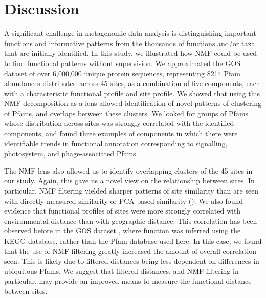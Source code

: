 
\section{Discussion}

A significant challenge in metagenomic data analysis is distinguishing important functions and informative patterns from the thousands of functions and/or taxa that are initially identified. In this study, we illustrated how NMF could be used to find functional patterns without supervision.  We approximated the GOS dataset of over 6,000,000 unique protein sequences, representing 8214 Pfam abundances distributed across 45 sites, as a combination of five components, each with a characteristic functional profile and site profile. We showed that using this NMF decomposition as a lens allowed identification of novel patterns of clustering of Pfams, and overlaps between these clusters.  We looked for groups of Pfams whose distribution across sites was strongly correlated with the identified components, and found three examples of components in which there were identifiable trends in functional annotation corresponding to signalling, photosystem, and phage-associated Pfams.

The NMF lens also allowed us to identify overlapping clusters of the 45 sites in our study.  Again, this gave us a novel view on the relationship between sites.   In particular, NMF filtering yielded sharper patterns of site similarity than are seen with directly measured similarity or PCA-based similarity (). We also found evidence that functional profiles of sites were more strongly correlated with environmental distance than with geographic distance.  This correlation has been observed before in the GOS dataset \cite{raes_toward_2011}, where function was inferred using the KEGG database, rather than the Pfam database used here.  In this case, we found that the use of NMF filtering greatly increased the amount of overall correlation seen.  This is likely due to filtered distances being less dependent on differences in ubiquitous Pfams.  We suggest that filtered distances, and NMF filtering in particular, may provide an improved means to measure the functional distance between sites.

